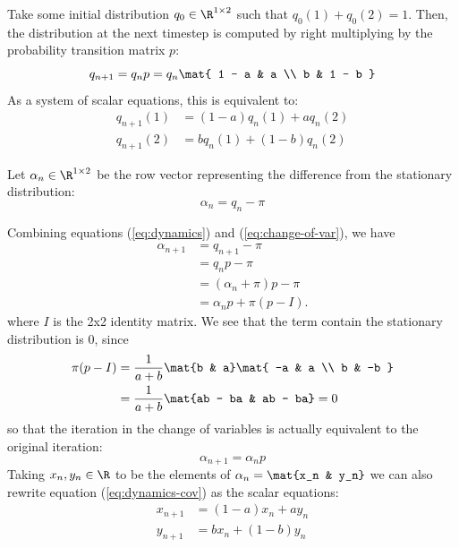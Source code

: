 \documentclass{homework}
\begin{document}
\begin{letterenum}
\item Take some initial distribution $q_0\in \R^{1\times 2}$ such that
$q_0(1) + q_0(2) = 1$. Then, the distribution at the next timestep
is computed by right multiplying by the probability transition matrix $p$:
\begin{equation}
    q_{n+1} = q_n p = q_n \mat{
        1 - a & a \\
        b & 1 - b
    }
    \label{eq:dynamics}
\end{equation}
As a system of scalar equations, this is equivalent to:
\begin{align*}
    q_{n+1}(1) &= (1 - a) q_n(1) + a q_n(2) \\
    q_{n+1}(2) &= b q_n(1) + (1-b) q_n(2)
\end{align*}

\item Let $\alpha_n \in \R^{1 \times 2}$ be the row vector representing
the difference from the stationary distribution:
\begin{equation}
    \alpha_n = q_n - \pi
    \label{eq:change-of-var}
\end{equation}

Combining equations (\ref{eq:dynamics}) and (\ref{eq:change-of-var}),
we have
\begin{align*}
    \alpha_{n+1} &= q_{n+1} - \pi \\
        &= q_n p - \pi \\
        &= (\alpha_n + \pi) p - \pi \\
        &= \alpha_n p + \pi (p - I).
\end{align*}
where $I$ is the 2x2 identity matrix.
We see that the term contain the stationary distribution is 0, since
\begin{align*}
    \pi (p - I) &= \frac{1}{a + b} \mat{b & a} \mat{
        -a & a \\
        b & -b
    } \\
    &= \frac{1}{a + b} \mat{ab - ba & ab - ba} = 0
\end{align*}
so that the iteration in the change of variables is actually equivalent
to the original iteration:
\begin{equation}
    \alpha_{n+1} = \alpha_n p
    \label{eq:dynamics-cov}
\end{equation}
Taking $x_n, y_n \in \R$ to be the elements of $\alpha_n = \mat{x_n & y_n}$
we can also rewrite equation (\ref{eq:dynamics-cov}) as the scalar equations:
\begin{align*}
    x_{n+1} &= (1 - a) x_n + a y_n \\
    y_{n+1} &= b x_n + (1-b) y_n
\end{align*}


\end{letterenum}
\end{document}
